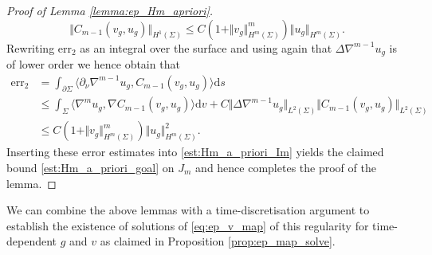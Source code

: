\documentclass[10pt,reqno]{amsart}
\theoremstyle{plain}
\theoremstyle{definition}
\numberwithin{equation}{section}
\newcommand{\Si}{\Sigma}
\newcommand{\De}{\Delta}
\newcommand{\norm}[1]{\Vert#1\Vert}
\newcommand{\beq}{\begin{equation}}
\newcommand{\eeq}{\end{equation}}
\newcommand{\beqas}{\begin{equation*}\begin{aligned}}
\newcommand{\eeqas}{\end{aligned}\end{equation*}}
\newcommand{\dd}{\mathrm{d}} %
\newcommand{\na}{\nabla}
\newcommand{\p}{\partial} %
\newcommand{\inner}[2]{\langle #1, #2\rangle} %
\newcommand{\err}{\text{err}}
\begin{document}
\begin{proof}[Proof of Lemma \ref{lemma:ep_Hm_apriori}]
    \beq\label{est:comm-weaker-sect3}
        \norm{C_{m-1}(v_g,u_g)}_{H^1(\Si)}\leq  C(1 + \norm{v_g}_{H^{m}(\Si)}^m)\norm{u_g}_{H^m(\Si)}  . 
    \eeq
    Rewriting $\err_2$ as an integral over the surface and using again that $\De \na^{m-1} u_g$ is of lower order we hence obtain that
    \beqas
        \err_2 & = \int_{\p\Si}\inner{\p_\nu\nabla^{m-1}u_g}{C_{m-1}(v_g,u_g)}\dd s\\
        &\leq \int_{\Si}\inner{\nabla^m u_g}{\nabla C_{m-1}(v_g,u_g)}\dd v + C\norm{\De \na^{m-1} u_g}_{L^2(\Si)}\norm{C_{m-1}(v_g,u_g)}_{L^2(\Si)}\\
		&\leq C\left(1 + \norm{v_g}_{H^{m}(\Si)}^m\right)\norm{u_g}_{H^m(\Si)}^2.
	\eeqas
    Inserting these error estimates into \eqref{est:Hm_a_priori_Im} yields the claimed bound \eqref{est:Hm_a_priori_goal} on $J_m$ and hence completes the proof of the lemma. 
\end{proof}

We can combine the above lemmas with a time-discretisation argument to establish the existence of solutions of \eqref{eq:ep_v_map} of this regularity for time-dependent $g$ and $v$ as claimed in Proposition \ref{prop:ep_map_solve}.
\end{document}
